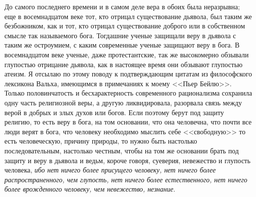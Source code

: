 \documentclass[12pt]{article}
\begin{document}
До самого последнего времени и в самом деле вера в обоих была неразрывна; еще в восемнадцатом веке тот, кто отрицал существование дьявола, был таким же безбожником, как и тот, кто отрицал существование доброго или в собственном смысле так называемого бога. Тогдашние ученые защищали веру в дьявола с таким же остроумием, с каким современные ученые защищают веру в бога. В восемнадцатом веке ученые, даже протестантские, так же высокомерно обзывали глупостью отрицание дьявола, как в настоящее время они обзывают глупостью атеизм. Я отсылаю по этому поводу к подтверждающим цитатам из философского лексикона Вальха, имеющимся в примечаниях к моему <<Пьер Бейлю>>. Только половинчатость и бесхарактерность современного рационализма сохранила одну часть религиозной веры, а другую ликвидировала, разорвала связь между верой в добрых и злых духов или богов. Если поэтому берут под защиту религию, то есть веру в бога, на том основании, что она человечна, что почти все люди верят в бога, что человеку необходимо мыслить себе <<свободную>>  то есть человеческую, причину природы, то нужно быть настолько последовательным, настолько честным, чтобы на том же основании брать под защиту и веру в дьявола и ведьм, короче говоря, суеверия, невежество и глупость человека, \emph{ибо нет ничего более присущего человеку, нет ничего более распространенного, чем глупость, нет ничего более естественного, нет ничего более врожденного человеку, чем невежество, незнание}. 
\end{document}
